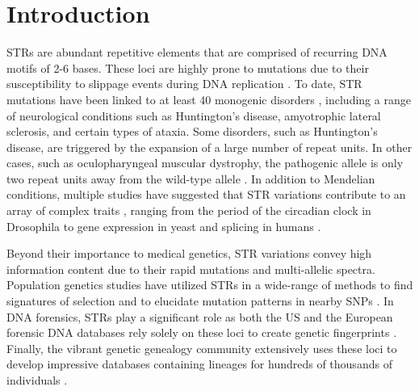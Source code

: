 \section{Introduction}
STRs are abundant repetitive elements that are comprised of recurring DNA motifs of 2-6 bases. These loci are highly prone to mutations due to their susceptibility to slippage events during DNA replication \cite{Ellegren2004}. To date, STR mutations have been linked to at least 40 monogenic disorders \cite{PearsonNicholEdamuraCleary2005,Mirkin2007}, including a range of neurological conditions such as Huntington's disease, amyotrophic lateral sclerosis, and certain types of ataxia. Some disorders, such as Huntington's disease, are triggered by the expansion of a large number of repeat units. In other cases, such as oculopharyngeal muscular dystrophy, the pathogenic allele is only two repeat units away from the wild-type allele \cite{BraisBouchardXieEtAl1998}. In addition to Mendelian conditions, multiple studies have suggested that STR variations contribute to an array of complex traits \cite{GemayelVincesLegendreEtAl2010}, ranging from the period of the circadian clock in Drosophila \cite{SawyerHennessyPeixotoEtAl1997} to gene expression in yeast \cite{VincesLegendreCaldaraEtAl2009} and splicing in humans \cite{HefferonGromanYurkEtAl2004,SathasivamNeuederGipsonEtAl2013}.

Beyond their importance to medical genetics, STR variations convey high information content due to their rapid mutations and multi-allelic spectra. Population genetics studies have utilized STRs in a wide-range of methods to find signatures of selection and to elucidate mutation patterns in nearby SNPs \cite{TishkoffVarkonyiCahinhinanEtAl2001,SunHelgasonMassonEtAl2012}. In DNA forensics, STRs play a significant role as both the US and the European forensic DNA databases rely solely on these loci to create genetic fingerprints \cite{KayserKnijff2011}. Finally, the vibrant genetic genealogy community extensively uses these loci to develop impressive databases containing lineages for hundreds of thousands of individuals \cite{KhanMittelman2013}.

